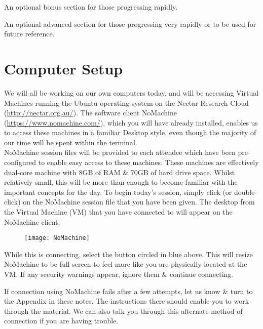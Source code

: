 \begin{bonus}
An optional bonus section for those progressing rapidly. \\
\end{bonus}

\begin{advanced}
An optional advanced section for those progressing very rapidly or to be used for future reference. \\
\end{advanced}

\section{Computer Setup}
\begin{information}
We will all be working on our own computers today, and will be accessing Virtual Machines running the Ubuntu operating system on the Nectar Research Cloud (\url{http://nectar.org.au/}).
The software client NoMachine (\url{https://www.nomachine.com/}), which you will have already installed, enables us to access these machines in a familiar Desktop style, even though the majority of our time will be spent within the terminal. \\

NoMachine session files will be provided to each attendee which have been pre-configured to enable easy access to these machines.
These machines are effectively dual-core machine with 8GB of RAM \& 70GB of hard drive space.
Whilst relatively small, this will be more than enough to become familiar with the important concepts for the day.
To begin today's session, simply click (or double-click) on the NoMachine session file that you have been given.
The desktop from the Virtual Machine (VM) that you have connected to will appear on the NoMachine client. \\
\end{information}

\begin{figure}[h!]
  \centering
    \texttt{[image: NoMachine]}
\end{figure}

While this is connecting, select the button circled in blue above.
This will resize NoMachine to be full screen to feel more like you are physically located at the VM.
If any security warnings appear, ignore them \& continue connecting. \\

\begin{warning}
If connection using NoMachine fails after a few attempts, let us know \& turn to the Appendix in these notes.
The instructions there should enable you to work through the material.
We can also talk you through this alternate method of connection if you are having trouble.
\end{warning}


